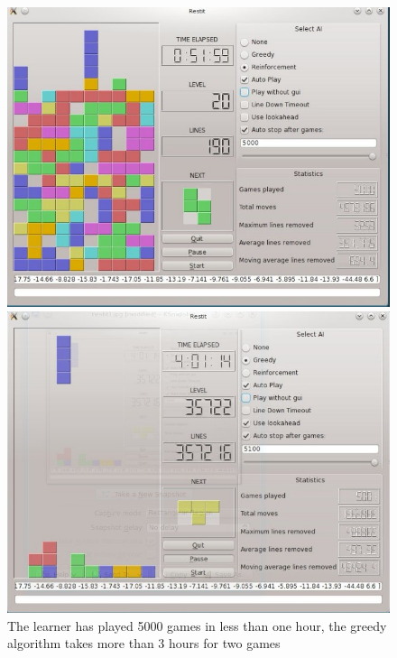 \documentclass{ml}
\begin{document}
\begin{figure}[h!]
\centering
\begin{minipage}[t]{0.49\textwidth}
\includegraphics[width=\textwidth]{img/restit.jpg}
\end{minipage}
\begin{minipage}[t]{0.49\textwidth}
\includegraphics[width=\textwidth]{img/video1.jpg}
\end{minipage}
\caption{\small{The learner has played 5000 games in less than one hour, the greedy algorithm takes more than 3 hours for two games}}
\label{demo}
\end{figure}
\end{document}

